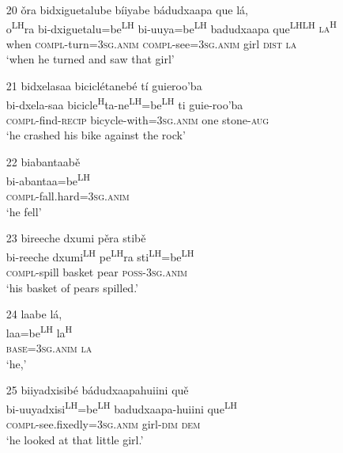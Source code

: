 \begin{itemize}
\item[20]
\glll \v{o}ra bidxiguetalube b\'{i}iyabe b\'{a}dudxaapa que l\'{a},\\
o\textsuperscript{LH}ra bi-dxiguetalu=be\textsuperscript{LH} bi-uuya=be\textsuperscript{LH} badudxaapa que\textsuperscript{LH}\textsuperscript{LH} \textsc{la\textsuperscript{H}}\\
when \textsc{compl}-turn=3\textsc{sg.anim} \textsc{compl}-see=3\textsc{sg.anim} girl \textsc{dist} \textsc{la}\\
\glt `when he turned and saw that girl'


\item[21]
\glll bidxelasaa bicicl\'{e}taneb\'{e} t\'{i} guieroo'ba\\
bi-dxela-saa bicicle\textsuperscript{H}ta-ne\textsuperscript{LH}=be\textsuperscript{LH} ti guie-roo'ba\\
\textsc{compl}-find-\textsc{recip} bicycle-with=3\textsc{sg.anim} one stone-\textsc{aug}\\
\glt `he crashed his bike against the rock' 


\item[22]
\glll biabantaab\v{e}\\
bi-abantaa=be\textsuperscript{LH}\\
\textsc{compl}-fall.hard=3\textsc{sg.anim}\\
\glt `he fell'


\item[23]
\glll bireeche dxumi p\v{e}ra stib\v{e}\\
bi-reeche dxumi\textsuperscript{LH} pe\textsuperscript{LH}ra sti\textsuperscript{LH}=be\textsuperscript{LH}\\
\textsc{compl}-spill basket pear \textsc{poss}-3\textsc{sg.anim}\\
\glt `his basket of pears spilled.'


\item[24]
\glll laabe l\'{a},\\
laa=be\textsuperscript{LH} la\textsuperscript{H}\\
\textsc{base}=3\textsc{sg.anim} \textsc{la}\\
\glt `he,'


\item[25]
\glll biiyadxisib\'{e} b\'{a}dudxaapahuiini qu\v{e}\\
bi-uuyadxisi\textsuperscript{LH}=be\textsuperscript{LH} badudxaapa-huiini que\textsuperscript{LH}\\
\textsc{compl}-see.fixedly=3\textsc{sg.anim} girl-\textsc{dim} \textsc{dem}\\
\glt `he looked at that little girl.' 



\end{itemize}
